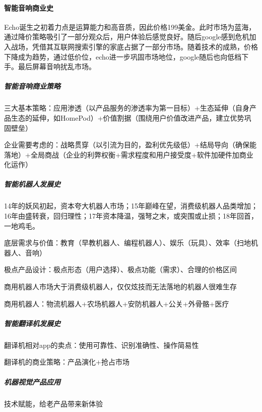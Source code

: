 \documentclass[letterpaper,11pt,english]{sphinxmanual}
\begin{document}
\paragraph{智能音响商业史}
\label{\detokenize{chapter_project/AI_hardware:id7}}
Echo诞生之初着力点是运算能力和高音质，因此价格199美金。此时市场为蓝海，通过降价策略吸引了一部分观众后，用户体验后感觉良好。随后google感到危机加入战场，凭借其互联网搜索引擎的家底占据了一部分市场。随着技术的成熟，价格下降成为趋势，通过低价位，echo进一步巩固市场地位，google随后也向低档下手。最后屏幕音响扰乱市场。


\subparagraph{智能音响商业策略}
\label{\detokenize{chapter_project/AI_hardware:id8}}
三大基本策略：应用渗透（以产品服务的渗透率为第一目标）+生态延伸（自身产品生态的延伸，如HomePod）+价值割据（围绕用户价值改进产品，建立优势巩固壁垒）

企业需要考虑的：战略贯穿（以引流为目的，盈利优先级低）+结局导向（确保能落地）+全局商战（企业的利弊权衡+需求程度和用户接受度+软件加硬件加商业化运作）


\subparagraph{智能机器人发展史}
\label{\detokenize{chapter_project/AI_hardware:id9}}
14年的妖风初起，资本夸大机器人市场；15年巅峰在望，消费级机器人品类增加；16年由盛转衰，回归理性；17年资本降温，强弩之末，或突围或止损；18年回首，一地鸡毛。

底层需求与价值：教育（早教机器人、编程机器人）、娱乐（玩具）、效率（扫地机器人、音响）

极点产品设计：极点形态（用户选择）、极点功能（需求）、合理的价格区间

商用机器人市场大于消费级机器人，仅仅炫技而无法落地的机器人很难生存

商用机器人：物流机器人+农场机器人+安防机器人+公关+外骨骼+医疗


\subparagraph{智能翻译机发展史}
\label{\detokenize{chapter_project/AI_hardware:id10}}
翻译机相对app的卖点：使用可靠性、识别准确性、操作简易性

翻译机的商业策略：产品演化+抢占市场


\subparagraph{机器视觉产品应用}
\label{\detokenize{chapter_project/AI_hardware:id11}}
技术赋能，给老产品带来新体验
\end{document}
